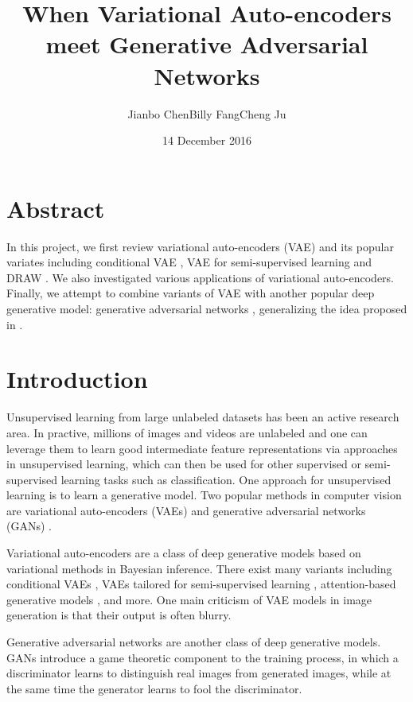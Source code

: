 \documentclass[10pt]{article}
\title{When Variational Auto-encoders meet Generative Adversarial Networks}
\date{14 December 2016}
\author{Jianbo Chen\quad Billy Fang\quad Cheng Ju}
\begin{document}
\maketitle


\section{Abstract}
In this project, we first review variational auto-encoders (VAE) and its popular variates including conditional VAE \cite{sohn2015learning}, VAE for semi-supervised learning \cite{DBLP:journals/corr/KingmaRMW14} and DRAW \cite{chung2015recurrent}. We also investigated various applications of variational auto-encoders. Finally, we attempt to combine variants of VAE with another popular deep generative model: generative adversarial networks \cite{goodfellow2014gan}, generalizing the idea proposed in \cite{larsen2015autoencoding}. 


\section{Introduction}
Unsupervised learning from large unlabeled datasets has been an active research area. In practive, millions of images and videos are unlabeled and one can leverage them to learn good intermediate feature representations via approaches in unsupervised learning, which can then be used for other supervised or semi-supervised learning tasks such as classification. One approach for unsupervised learning is to learn a generative model. Two popular methods in computer vision are variational auto-encoders (VAEs) \cite{kingma2013auto} and generative adversarial networks (GANs) \cite{goodfellow2014gan}. 

Variational auto-encoders are a class of deep generative models based on variational methods in Bayesian inference. There exist many variants including conditional VAEs \cite{doersch2016tutorial}, VAEs tailored for semi-supervised learning \cite{DBLP:journals/corr/KingmaRMW14}, attention-based generative models \cite{gregor2015draw}, and more. One main criticism of VAE models in image generation is that their output is often blurry. 

Generative adversarial networks are another class of deep generative models. GANs introduce a game theoretic component to the training process, in which a discriminator learns to distinguish real images from generated images, while at the same time the generator learns to fool the discriminator. 
\end{document}
